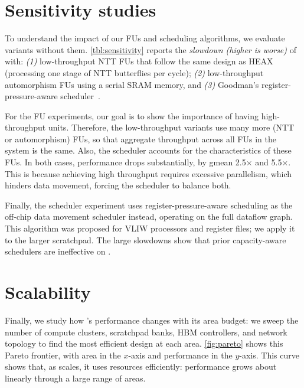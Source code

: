 \figOpBreakdown

\section{Sensitivity studies} \label{sec:sensitivity}

\tblSensitivity

To understand the impact of our FUs and scheduling algorithms, we evaluate \name variants without them.
\autoref{tbl:sensitivity} reports the \emph{slowdown (higher is worse)} of \name with:
\emph{(1)} low\hyp{}throughput NTT FUs that follow the same design as HEAX
(processing one stage of NTT butterflies per cycle); %
\emph{(2)} low\hyp{}throughput automorphism FUs using a serial SRAM memory,
and \emph{(3)} Goodman's register-pressure-aware scheduler~\cite{goodman:ics1988:code}.

For the FU experiments, our goal is to show the importance of having high-throughput units.
Therefore, the low-throughput variants use many more (NTT or automorphism) FUs,
so that aggregate throughput across all FUs in the system is the same.
Also, the scheduler accounts for the characteristics of these FUs.
In both cases, performance drops substantially, by gmean 2.5$\times$ and 5.5$\times$.
This is because achieving high throughput requires excessive parallelism,
which hinders data movement, forcing the scheduler to balance both.

Finally, the scheduler experiment uses register-pressure-aware scheduling
as the off-chip data movement scheduler instead, operating on the full dataflow graph.
This algorithm was proposed for VLIW processors and register files; we apply it to the larger scratchpad.
The large slowdowns show that prior capacity-aware schedulers are ineffective on \name.


\figConfigs

\section{Scalability} \label{sec:scalability}


Finally, we study how \name's performance changes with its area budget: 
we sweep the number of compute clusters, scratchpad banks, HBM controllers,
and network topology to find the most efficient design at each area.
\autoref{fig:pareto} shows this Pareto frontier, with
area in the $x$-axis and performance in the $y$-axis.
This curve shows that, as \name scales, it uses resources efficiently:
performance grows about linearly through a large range of areas.

